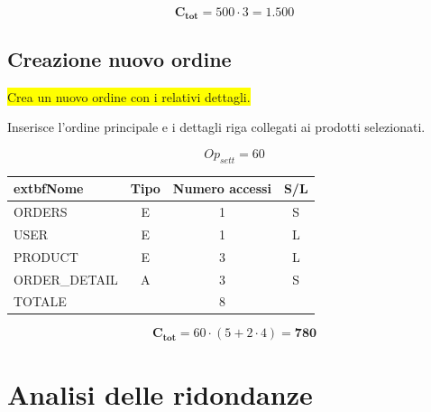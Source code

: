 \documentclass[a4paper,12pt]{report}
\begin{document}
$$\mathbf{C_{tot}} = 500 \cdot 3 = \mathbf{1.500}$$

\subsection*{Creazione nuovo ordine} \label{op20}
\colorbox{yellow}{Crea un nuovo ordine con i relativi dettagli.}

Inserisce l'ordine principale e i dettagli riga collegati ai prodotti
selezionati.

$$Op_{sett} = 60$$

\begin{table}[H]
  \centering
  \small
  \renewcommand{\arraystretch}{1.15}
  \begin{tabularx}{0.8\textwidth}{|X|c|c|c|}
    \hline
    \rowcolor{gray!20}
    extbf{Nome} & \textbf{Tipo} & \textbf{Numero accessi} & \textbf{S/L} \\
    \hline
    ORDERS & E & 1 & S \\
    USER & E & 1 & L \\
    PRODUCT & E & 3 & L \\
    ORDER\_DETAIL & A & 3 & S \\
    \hline
    \rowcolor{gray!20}
    TOTALE & & 8 & \\
    \hline
  \end{tabularx}
  \vspace{-1em}
\end{table}

$$\mathbf{C_{tot}} = 60 \cdot (5 + 2 \cdot 4) = \mathbf{780}$$

\section{Analisi delle ridondanze}
\end{document}
